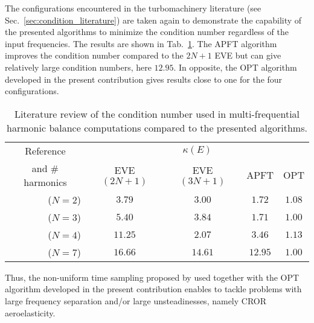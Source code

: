 The configurations encountered in the turbomachinery literature 
(see Sec.~\ref{sec:condition_literature})
are taken again to demonstrate the capability of the presented
algorithms to minimize the condition number
regardless of the input frequencies. The results are shown in 
Tab.~\ref{tab:literature_multistage2}.
The APFT algorithm improves the condition number compared to the
$2N+1$ EVE but can give relatively large condition numbers, here $12.95$. 
In opposite, the OPT algorithm developed in the
present contribution gives results close to one for the four configurations.
\begin{table}[htp]
   \centering
  \begin{tabular}{rcccc}
    \toprule
    \multicolumn{1}{c}{Reference} & \multicolumn{4}{c}{$\kappa(E)$} \\
    \multicolumn{1}{c}{and \# harmonics} & EVE $(2N+1)$ & EVE $(3N+1)$ & APFT & OPT \\
    \midrule
    \citet{Gopinath2007} ($N=2$) & $\mathbf{3.79}$ & $3.00$ & $1.72$ & $1.08$ \\
    \citet{Ekici2007} ($N=3$) & $5.40$ & $\mathbf{3.84}$ & $1.71$ & $1.00$ \\
    \citet{Gopinath2007} ($N=4$) & $\mathbf{11.25}$ & $2.07$ & $3.46$ & $1.13$ \\
    \citet{Gopinath2007} ($N=7$) & $\mathbf{16.66}$ & $14.61$ & $12.95$ & $1.00$ \\
    \bottomrule
  \end{tabular}
  \caption{Literature review of the condition number used in multi-frequential
  harmonic balance computations compared to the presented algorithms.}
  \label{tab:literature_multistage2}
\end{table}


Thus, the non-uniform time sampling proposed by \citet{ThesisGuedeney}
used together with the OPT algorithm developed in the present contribution
enables to tackle problems with large frequency separation and/or large unsteadinesses,
namely CROR aeroelasticity.


